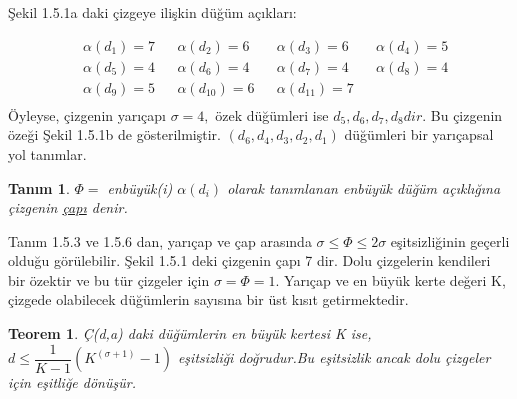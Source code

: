 \documentclass[11pt]{amsbook}
\begin{document}


\newtheorem{defn}{Tanım}[section]
\newtheorem{thm}{Teorem}[section]
\hspace{1cm}Şekil 1.5.1a daki çizgeye ilişkin düğüm açıkları:

\begin{align*}
	&\alpha(d_1)=7 &   &\alpha(d_2)=6  &  &\alpha(d_3)=6 &  &\alpha(d_4)=5 \\
	&\alpha(d_5)=4 &  &\alpha(d_6)=4  &  &\alpha(d_7)=4 &  &\alpha(d_8)=4 \\
	&\alpha(d_9)=5 &  &\alpha(d_{10})=6  &  &\alpha(d_{11})=7 \\
\end{align*}
\hspace{1cm}Öyleyse, çizgenin yarıçapı 
$\sigma = 4, 
$
özek düğümleri ise
$ d_5,d_6,d_7,d_8 dir. 
$
Bu çizgenin özeği Şekil 1.5.1b de gösterilmiştir.
$ (d_6,d_4,d_3,d_2,d_1)
$
düğümleri bir yarıçapsal yol tanımlar.\\
\begin{defn}
	$\Phi =  
	$
	enbüyük(i)
	${\alpha(d_i)}
	$
	olarak tanımlanan enbüyük düğüm
	açıklığına çizgenin \underline{çapı} denir.
\end{defn}

\hspace{1cm}Tanım 1.5.3 ve 1.5.6 dan, yarıçap ve çap arasında
$\sigma  \leq \Phi \leq  2\sigma
$
eşitsizliğinin geçerli olduğu görülebilir. Şekil 1.5.1 deki çizgenin çapı 7 dir. Dolu çizgelerin kendileri bir özektir ve bu tür çizgeler için
$\sigma = \Phi = 1.
$
Yarıçap ve en büyük kerte değeri K, çizgede olabilecek düğümlerin sayısına bir üst kısıt getirmektedir.
\begin{thm}
	Ç(d,a) daki düğümlerin en büyük kertesi K ise,
	$d \leq  \dfrac{1}{K - 1} (K^{(\sigma+1)}-1)
	$
	eşitsizliği doğrudur.Bu eşitsizlik ancak dolu çizgeler için eşitliğe dönüşür.
\end{thm}
\end{document}
